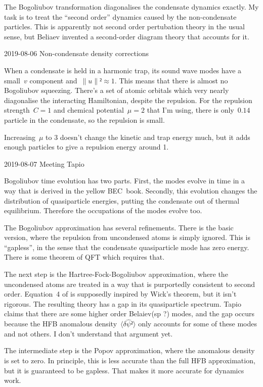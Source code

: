 The Bogoliubov transformation diagonalises the condensate dynamics exactly.  My task is to treat the “second order” dynamics caused by the non-condensate particles.  This is apparently not second order pertubation theory in the usual sense, but Beliaev invented a second-order diagram theory that accounts for it.


2019-08-06 Non-condensate density corrections

When a condensate is held in a harmonic trap, its sound wave modes have a small~$v$ component and~$∥u∥²≈1$.  This means that there is almost no Bogoliubov squeezing.  There's a set of atomic orbitals which very nearly diagonalise the interacting Hamiltonian, despite the repulsion.  For the repulsion strength~$C=1$ and chemical potential~$μ=2$ that I'm using, there is only~$0.14$ particle in the condensate, so the repulsion is small.

Increasing~$μ$ to 3 doesn't change the kinetic and trap energy much, but it adds enough particles to give a repulsion energy around 1.

2019-08-07 Meeting Tapio

Bogoliubov time evolution has two parts.  First, the modes evolve in time in a way that is derived in the yellow BEC\ book.  Secondly, this evolution changes the distribution of quasiparticle energies, putting the condensate out of thermal equilibrium.  Therefore the occupations of the modes evolve too.

The Bogoliubov approximation has several refinements.  There is the basic version, where the repulsion from uncondensed atoms is simply ignored.  This is “gapless”, in the sense that the condensate quasiparticle mode has zero energy.  There is some theorem of QFT which requires that.

The next step is the Hartree-Fock-Bogoliubov approximation, where the uncondensed atoms are treated in a way that is purportedly consistent to second order.  Equation~4 of \cite{prb-53-9341} is supposedly inspired by Wick's theorem, but it isn't rigorous.  The resulting theory has a gap in its quasiparticle spectrum.  Tapio claims that there are some higher order Belaiev(sp ?) modes, and the gap occurs because the HFB anomalous density~$〈δ\hat ψ²〉$ only accounts for some of these modes and not others.  I don't understand that argument yet.

The intermediate step is the Popov approximation, where the anomalous density is set to zero.  In principle, this is less accurate than the full HFB approximation, but it is guaranteed to be gapless.  That makes it more accurate for dynamics work.

